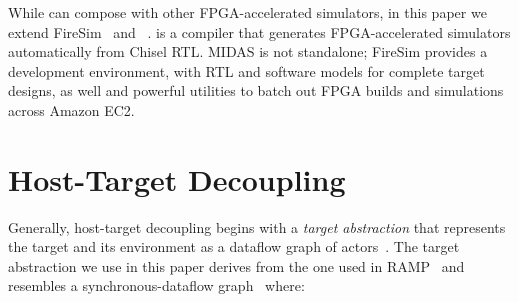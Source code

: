 While \PNAME can compose with other FPGA-accelerated simulators, in this paper
we extend FireSim~\cite{firesim} and {\SIMNAME}~\cite{midas}. \SIMNAME is a
compiler that generates FPGA-accelerated simulators automatically from Chisel
RTL. MIDAS is not standalone; FireSim provides a development
environment, with RTL and software models for complete target designs, as well
and powerful utilities to batch out FPGA builds and simulations across Amazon EC2.

\section{Host-Target Decoupling}\label{sec:target-decoupling}
Generally, host-target decoupling begins with a \emph{target abstraction} that
represents the target and its environment as a dataflow graph of actors~\cite{LIBDN,APortNetworks}.  The target abstraction we use in this paper
derives from the one used in RAMP~\cite{RAMP} and resembles a
synchronous-dataflow graph~\cite{SDF} where:


